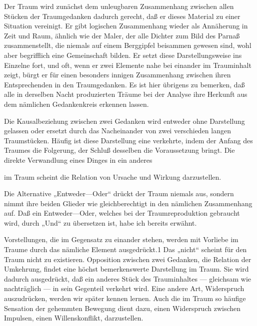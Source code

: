\documentclass{article}
\begin{document}
            
        \pstart
        Der Traum wird zunächst dem unleugbaren Zusammenhang zwischen allen Stücken der
               Traumgedanken dadurch gerecht, daß er dieses Material zu einer Situation
               vereinigt. Er gibt logischen Zusammenhang wieder
               als Annäherung in Zeit und Raum, ähnlich wie der
               Maler, der alle Dichter zum Bild des Parnaß zusammenstellt, die niemals auf
               einem Berggipfel beisammen gewesen sind, wohl aber begrifflich eine
               Gemeinschaft bilden. Er setzt diese Darstellungsweise ins Einzelne fort,
               und oft, wenn er zwei Elemente nahe bei einander im Trauminhalt zeigt,
               bürgt er für einen besonders innigen Zusammenhang zwischen ihren Entsprechenden
               in den Traumgedanken. Es ist hier übrigens zu bemerken, daß alle in derselben
               Nacht produzierten Träume bei der Analyse ihre Herkunft aus dem nämlichen
               Gedankenkreis erkennen lassen.
        \pend
    
            
        \pstart
        Die Kausalbeziehung zwischen zwei Gedanken wird
                  entweder ohne Darstellung gelassen oder ersetzt durch das Nacheinander von zwei verschieden langen Traumstücken. Häufig ist diese
               Darstellung eine verkehrte, indem der Anfang des Traumes die Folgerung, der
               Schluß desselben die Voraussetzung bringt. Die direkte Verwandlung eines Dinges in ein anderes
        \pend
    
         
            
            
            
        \pstart
        im Traum scheint die Relation von Ursache
               und Wirkung darzustellen.
        \pend
    
            
        \pstart
        Die Alternative „Entweder—Oder“ drückt der Traum
               niemals aus, sondern nimmt ihre beiden Glieder wie gleichberechtigt
               in den nämlichen Zusammenhang auf. Daß ein Entweder—Oder, welches bei
               der Traumreproduktion gebraucht wird, durch „Und“ zu übersetzen ist, habe ich bereits erwähnt.
        \pend
    
            
        \pstart
        Vorstellungen, die im Gegensatz zu einander stehen, werden mit Vorliebe im
               Traume durch das nämliche Element ausgedrückt.1 Das „nicht“ scheint für den Traum nicht zu existieren. Opposition
               zwischen zwei Gedanken, die Relation der Umkehrung,
               findet eine höchst bemerkenswerte Darstellung im Traum. Sie wird dadurch
               ausgedrückt, daß ein anderes Stück des Trauminhaltes — gleichsam wie
               nachträglich — in sein Gegenteil verkehrt wird. Eine andere Art, Widerspruch auszudrücken, werden wir später
               kennen lernen. Auch die im Traum so häufige Sensation der gehemmten Bewegung dient dazu, einen Widerspruch
               zwischen Impulsen, einen Willenskonflikt,
               darzustellen.
        \pend
    
\end{document}
